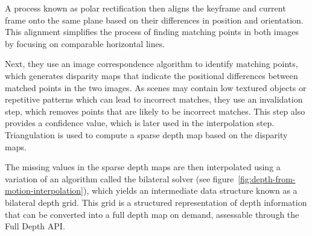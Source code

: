 A process known as polar rectification then aligns the keyframe and current frame onto the same plane based on their differences in position and orientation.
This alignment simplifies the process of finding matching points in both images by focusing on comparable horizontal lines.

Next, they use an image correspondence algorithm to identify matching points,
which generates disparity maps that indicate the positional differences between matched points in the two images.
As scenes may contain low textured objects or repetitive patterns which can lead to incorrect matches,
they use an invalidation step, which removes points that are likely to be incorrect matches.
This step also provides a confidence value, which is later used in the interpolation step.
Triangulation is used to compute a sparse depth map based on the disparity maps.

The missing values in the sparse depth maps are then interpolated using a variation of an algorithm called the bilateral solver (see figure~\ref{fig:depth-from-motion-interpolation}),
which yields an intermediate data structure known as a bilateral depth grid.
This grid is a structured representation of depth information that can be converted into a full depth map on demand,
assessable through the Full Depth API\@.

